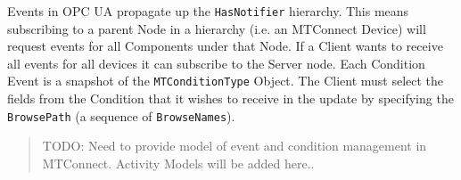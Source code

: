 Events in OPC UA propagate up the \texttt{HasNotifier} hierarchy. This means subscribing to a parent Node in a hierarchy (i.e. an MTConnect Device) will request events for all Components under that Node. If a Client wants to receive all events for all devices it can subscribe to the Server node.
Each Condition Event is a snapshot of the \texttt{MTConditionType} Object. The Client must select the fields from the Condition that it wishes to receive in the update by specifying the \texttt{BrowsePath} (a sequence of \texttt{BrowseNames}). 

\begin{quote}
    \color{red}
    TODO: Need to provide model of event and condition management in MTConnect. Activity Models will be added here..
\end{quote}

\clearpage
